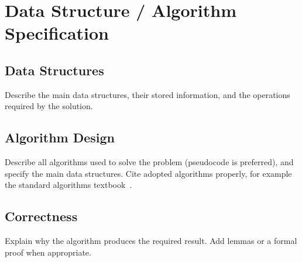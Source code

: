 \section{Data Structure / Algorithm Specification}

\subsection{Data Structures}

Describe the main data structures, their stored information, and the
operations required by the solution.

\subsection{Algorithm Design}

Describe all algorithms used to solve the problem (pseudocode is preferred),
and specify the main data structures. Cite adopted algorithms properly, for
example the standard algorithms textbook~\cite{10.5555/1614191}.

\subsection{Correctness}

Explain why the algorithm produces the required result. Add lemmas or a formal
proof when appropriate.
